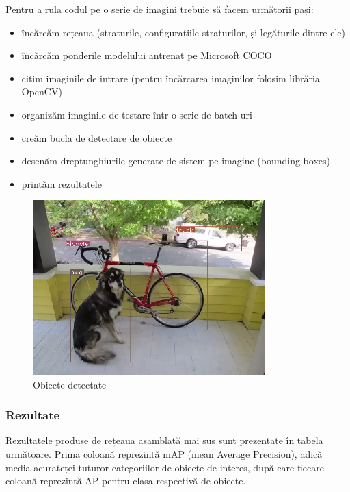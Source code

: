 Pentru a rula codul pe o serie de imagini trebuie să facem următorii pași:
\begin{itemize}
\item încărcăm rețeaua (straturile, configurațiile straturilor, și legăturile dintre ele)
\item încărcăm ponderile modelului antrenat pe Microsoft COCO
\item citim imaginile de intrare (pentru încărcarea imaginilor folosim librăria OpenCV)
\item organizăm imaginile de testare într-o serie de batch-uri
\item creăm bucla de detectare de obiecte
\item desenăm dreptunghiurile generate de sistem pe imagine (bounding boxes)
\item printăm rezultatele
\end{itemize}

\begin{figure}[h!]
    	\centering
	\captionsetup{justification=centering, margin=2cm}
	\includegraphics[width=0.8\textwidth]{figures/det_dog-cycle-car.png}
	\caption{Obiecte detectate \cite{DBLP:journals/corr/abs-1804-02767}}
	\label{fig:lethalities}
\end{figure}

\subsubsection{Rezultate}
Rezultatele produse de rețeaua asamblată mai sus sunt prezentate în tabela următoare. Prima coloană reprezintă mAP (mean Average Precision), adică media acurateței tuturor categoriilor de obiecte de interes, după care fiecare coloană reprezintă AP pentru clasa respectivă de obiecte.

